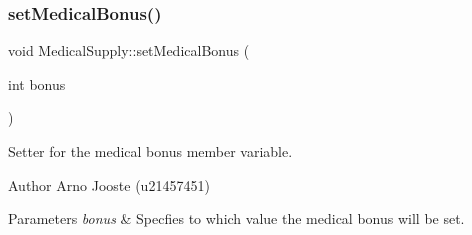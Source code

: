 \subsubsection{\texorpdfstring{setMedicalBonus()}{setMedicalBonus()}}
{\footnotesize\ttfamily void Medical\+Supply\+::set\+Medical\+Bonus (\begin{DoxyParamCaption}\item[{int}]{bonus }\end{DoxyParamCaption})}



Setter for the medical bonus member variable. 

\begin{DoxyAuthor}{Author}
Arno Jooste (u21457451) 
\end{DoxyAuthor}

\begin{DoxyParams}{Parameters}
{\em bonus} & Specfies to which value the medical bonus will be set. \\
\hline
\end{DoxyParams}
